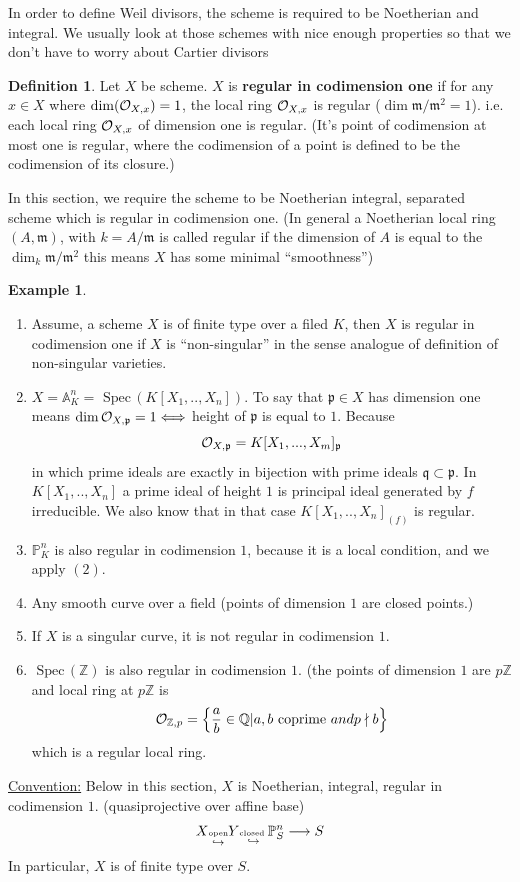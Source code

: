 \documentclass[11pt]{article}
\theoremstyle{definition}
\newtheorem{dfn}[thm]{Definition}
\newtheorem{ex}[thm]{Example}
\newcommand{\spec}{\text{ Spec}\,}
\newcommand{\affn}{\mathbb A}
\newcommand{\proj}{\mathbb P}
\newcommand{\intg}{\mathbb Z}
\newcommand{\ratl}{\mathbb Q}
\newcommand{\scm}{{\mathfrak m}}
\newcommand{\scp}{{\mathfrak p}}
\newcommand{\scq}{\mathfrak q}
\newcommand{\calo}{{\cal O}}
\newcommand{\lrta}{\longrightarrow}
\newcommand{\Llrta}{\Longleftrightarrow}
\newcommand{\inj}{\hookrightarrow}
\begin{document}
In order to define Weil divisors, the scheme is required to be Noetherian and integral. We usually look at those schemes with nice enough properties so that we don't have to worry about Cartier divisors
\begin{dfn}
Let $X$ be scheme. $X$ is \textbf{regular in codimension one} if for any $x\in X$ where $\dim(\calo_{X,x})=1$, the local ring $\calo_{X,x}$ is regular ($\dim \scm/\scm^2=1$). i.e. each local ring $\calo_{X,x}$ of dimension one is regular. (It's point of codimension at most one is regular, where the codimension of a point is defined to be the codimension of its closure.)
\end{dfn}

In this section, we require the scheme to be Noetherian integral, separated scheme which is regular in codimension one.
(In general a Noetherian local ring $(A,\scm)$, with $k=A/\scm$ is called regular if the dimension of $A$ is equal to the $\dim_k \scm/\scm^2$  this means $X$ has some minimal ``smoothness'')
\begin{ex}
\ \begin{enumerate}[label=(\arabic*)]
\item Assume, a scheme $X$ is of finite type over a filed $K$, then $X$ is regular in codimension one  if $X$ is ``non-singular'' in the sense analogue of definition of non-singular varieties.
\item $X=\affn_K^n=\spec(K[X_1,..,X_n])$. To say that $\scp\in X$ has dimension one means $\dim \calo_{X,\scp}=1\Llrta $ height of $\scp$ is equal to $1$. Because
$$
\calo_{X,\scp}=K[X_1,...,X_m]_{\scp} 
$$
in which prime ideals are exactly in bijection with prime ideals $\scq\subset \scp$. In $K[X_1,..,X_n]$ a prime ideal of height $1$ is principal ideal generated by $f$ irreducible. We also know that in that case $K[X_1,..,X_n]_{(f)}$ is regular.
\item $\proj^n_K$ is also regular in codimension $1$, because it is a local condition, and we apply $(2)$.
\item Any smooth curve over a field (points of dimension $1$ are closed points.)
\item If $X$ is a singular curve, it is not regular in codimension $1$.
\item $\spec(\intg)$ is also regular in codimension $1$. (the points of dimension $1$ are $p\intg$ and local ring  at $p\intg$ is 
$$
\calo_{\intg,p}=\left\{\frac{a}{b}\in \ratl| a,b \text{ coprime } and p\nmid b\right\}
$$
which is a regular local ring.
\end{enumerate}
\end{ex}
\underline{Convention:} Below in this section, $X$ is Noetherian, integral, regular in codimension $1$. (quasiprojective over affine base)
$$
X\underset{\inj}{\text{\tiny open}} Y\underset{\inj}{\text{\tiny closed }} \proj^n_S\lrta S
$$
In particular, $X$ is of finite type over $S$.
\end{document}

